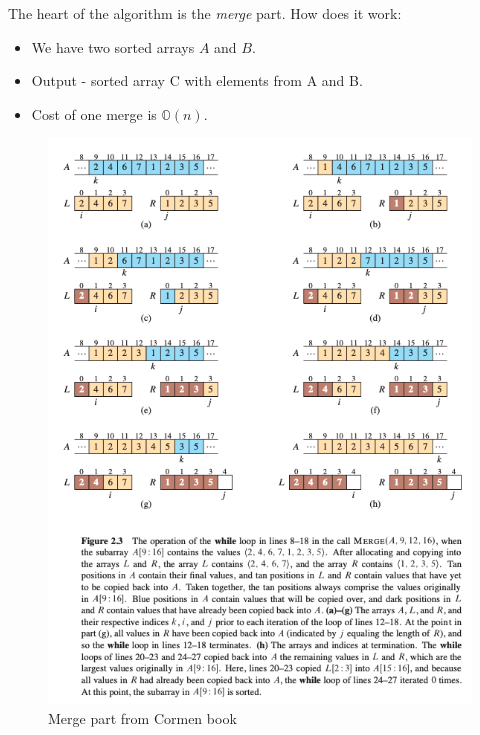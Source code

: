 \documentclass[a4paper,
  twoside, %
  headlines=2.1 %
  ]{scrartcl}
\begin{document}
    The heart of the algorithm is the \textit{merge} part. How does it work:
    
    \begin{itemize}
        \item We have two sorted arrays $A$ and $B$.
        \item Output - sorted array C with elements from A and B.
        \item Cost of one merge is $\mathbb{O}(n)$.
    \end{itemize}
    
    \begin{figure}[H]
            \centering
            \includegraphics[width=0.7\linewidth]{merge_part_cormen.png}
            \caption{Merge part from Cormen book}
            \label{fig:enter-label}
    \end{figure}    
    
\end{document}
